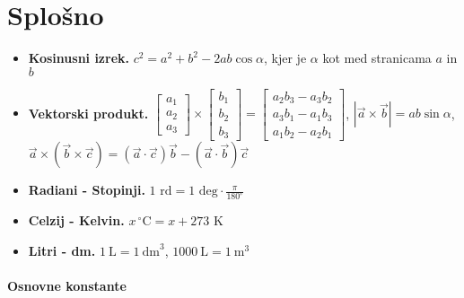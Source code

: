 \section*{Splošno}
\begin{itemize}
    \item \textbf{Kosinusni izrek.} \(c^2 = a^2 + b^2 - 2ab \cos \alpha\), kjer je \(\alpha\) kot med stranicama \(a\) in \(b\)
    \item \textbf{Vektorski produkt.} \(\begin{bmatrix}
        a_1 \\ a_2 \\ a_ 3
    \end{bmatrix} \times \begin{bmatrix}
        b_1 \\ b_2 \\ b_3
    \end{bmatrix} = \begin{bmatrix}
        a_2b_3 - a_3b_2 \\ a_3b_1 - a_1b_3 \\ a_1b_2 - a_2b_1
    \end{bmatrix} \), \(|\vec{a} \times \vec{b}| = ab \sin \alpha \), \(\vec{a} \times (\vec{b} \times \vec{c}) = (\vec{a} \cdot \vec{c}) \vec{b} - (\vec{a} \cdot \vec{b}) \vec{c}\)
    \item \textbf{Radiani - Stopinji.} \(1 \text{ rd} = 1 \text{ deg} \cdot \frac{\pi}{180^\circ}\)
    \item \textbf{Celzij - Kelvin.} \(x^{\ \circ} \text{C} = x + 273 \text{ K}\)
    \item \textbf{Litri - dm.} \(1 \ \text{L} = 1 \ \text{dm}^3\), \(1000 \  \text{L} = 1 \ \text{m}^3\)
\end{itemize}

\paragraph{Osnovne konstante} \ 

